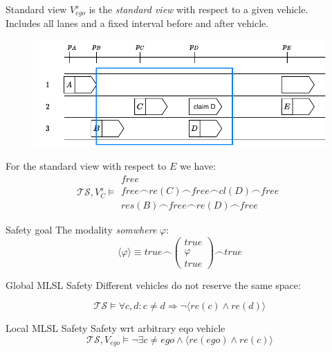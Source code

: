 \documentclass[xcolor=table]{beamer}
\begin{document}
\begin{frame}{Standard view}
$V^s_{ego}$ is the \textit{standard view} with respect to a given vehicle.\\
\bigskip
Includes all lanes and a fixed interval before and after vehicle.
\pause
\begin{figure}[h]
	\centering
	\includegraphics[width=0.7 \textwidth]{../figs/MLSL_standard_view}
\end{figure}
\pause
For the standard view with respect to $E$ we have:
\begin{equation*}
\mathcal{TS}, V^s_{C} \models \begin{matrix}free \\
											free \frown re(C) \frown free \frown cl(D) \frown free \\
											res(B) \frown free \frown re(D) \frown free \end{matrix}
\end{equation*}
\end{frame}

\begin{frame}{Safety goal}
The modality \textit{somwhere} $\varphi$:
\begin{equation*}
\langle \varphi \rangle \equiv true \frown \begin{pmatrix}true \\ \varphi \\ true\end{pmatrix} \frown true
\end{equation*}
\pause
\begin{block}{Global MLSL Safety}
Different vehicles do not reserve the same space:

\begin{equation*}
\mathcal{TS} \models \forall c, d: c \ne d \Rightarrow \neg \langle re(c) \land re(d)\rangle
\end{equation*}
\end{block}
\pause

\begin{block}{Local MLSL Safety}
Safety wrt arbitrary eqo vehicle
\begin{equation*}\label{eq:safety_goal}
\mathcal{TS}, V_{ego} \models \neg \exists c \neq ego \land \langle re(ego) \land re(c)\rangle
\end{equation*}
\end{block}
\end{frame}
\end{document}
